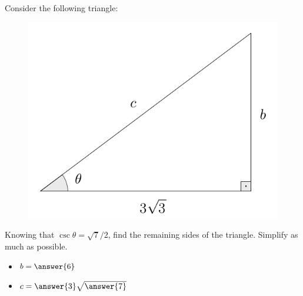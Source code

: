 \documentclass{ximera}
\author{Ivo Terek}
\begin{document}
\begin{exercise}
    
  Consider the following triangle:

  \begin{figure}[h]
    \centering
    \includegraphics[scale=.3]{RTT8-fig.png}
\end{figure}
  
  Knowing that $\csc\theta = \sqrt{7}/2$, find the remaining sides of the triangle. Simplify as much as possible.

  \begin{itemize}
  \item $b = \answer{6}$ 
  \item $c = \answer{3}\sqrt{\answer{7}}$
  \end{itemize}
\end{exercise}
\end{document}
